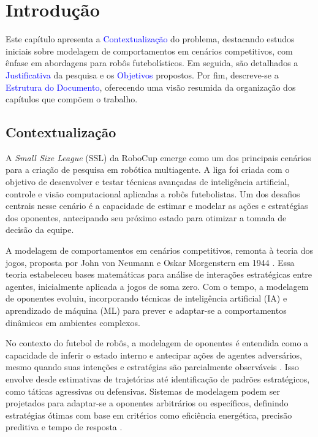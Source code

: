 \chapter[Introdução]{Introdução}

Este capítulo apresenta a \textcolor{blue}{Contextualização} do problema, destacando estudos iniciais sobre modelagem de comportamentos em cenários competitivos, com ênfase em abordagens para robôs futebolísticos. Em seguida, são detalhados a \textcolor{blue}{Justificativa} da pesquisa e os \textcolor{blue}{Objetivos} propostos. Por fim, descreve-se a \textcolor{blue}{Estrutura do Documento}, oferecendo uma visão resumida da organização dos capítulos que compõem o trabalho.

\section{Contextualização}

A \textit{Small Size League} (SSL)\cite{kitano1997robocup} da RoboCup emerge como um dos principais cenários para a criação de pesquisa em robótica multiagente. A liga foi criada com o objetivo de desenvolver e testar técnicas avançadas de inteligência artificial, controle e visão computacional aplicadas a robôs futebolistas. Um dos desafios centrais nesse cenário é a capacidade de estimar e modelar as ações e estratégias dos oponentes, antecipando seu próximo estado para otimizar a tomada de decisão da equipe.

A modelagem de comportamentos em cenários competitivos, remonta à teoria dos jogos, proposta por John von Neumann e Oskar Morgenstern em 1944 \cite{neumann1944theory}. Essa teoria estabeleceu bases matemáticas para análise de interações estratégicas entre agentes, inicialmente aplicada a jogos de soma zero. Com o tempo, a modelagem de oponentes evoluiu, incorporando técnicas de inteligência artificial (IA) e aprendizado de máquina (ML) para prever e adaptar-se a comportamentos dinâmicos em ambientes complexos.

No contexto do futebol de robôs, a modelagem de oponentes é entendida como a capacidade de inferir o estado interno e antecipar ações de agentes adversários, mesmo quando suas intenções e estratégias são parcialmente observáveis \cite{kitano1997robocup}. Isso envolve desde estimativas de trajetórias até identificação de padrões estratégicos, como táticas agressivas ou defensivas. Sistemas de modelagem podem ser projetados para adaptar-se a oponentes arbitrários ou específicos, definindo estratégias ótimas com base em critérios como eficiência energética, precisão preditiva e tempo de resposta \cite{stone2000layered}.


